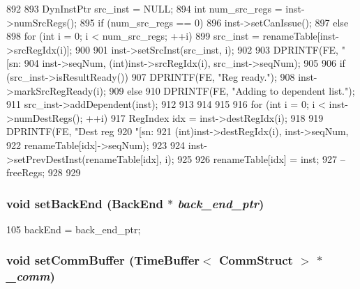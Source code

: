 \begin{DoxyCode}
892 {
893     DynInstPtr src_inst = NULL;
894     int num_src_regs = inst->numSrcRegs();
895     if (num_src_regs == 0) {
896         inst->setCanIssue();
897     } else {
898         for (int i = 0; i < num_src_regs; ++i) {
899             src_inst = renameTable[inst->srcRegIdx(i)];
900 
901             inst->setSrcInst(src_inst, i);
902 
903             DPRINTF(FE, "[sn:%
904                     inst->seqNum, (int)inst->srcRegIdx(i), src_inst->seqNum);
905 
906             if (src_inst->isResultReady()) {
907                 DPRINTF(FE, "Reg ready.\n");
908                 inst->markSrcRegReady(i);
909             } else {
910                 DPRINTF(FE, "Adding to dependent list.\n");
911                 src_inst->addDependent(inst);
912             }
913         }
914     }
915 
916     for (int i = 0; i < inst->numDestRegs(); ++i) {
917         RegIndex idx = inst->destRegIdx(i);
918 
919         DPRINTF(FE, "Dest reg %
920                 "[sn:%
921                 (int)inst->destRegIdx(i), inst->seqNum,
922                 renameTable[idx]->seqNum);
923 
924         inst->setPrevDestInst(renameTable[idx], i);
925 
926         renameTable[idx] = inst;
927         --freeRegs;
928     }
929 }
\end{DoxyCode}
\hypertarget{classFrontEnd_a5f15ff995704fecfa4b6e5d6147ec622}{
\subsubsection[{setBackEnd}]{\setlength{\rightskip}{0pt plus 5cm}void setBackEnd ({\bf BackEnd} $\ast$ {\em back\_\-end\_\-ptr})}}
\label{classFrontEnd_a5f15ff995704fecfa4b6e5d6147ec622}



\begin{DoxyCode}
105     { backEnd = back_end_ptr; }
\end{DoxyCode}
\hypertarget{classFrontEnd_aeabdb9f0aae07df67c3029f8fddb2693}{
\subsubsection[{setCommBuffer}]{\setlength{\rightskip}{0pt plus 5cm}void setCommBuffer ({\bf TimeBuffer}$<$ {\bf CommStruct} $>$ $\ast$ {\em \_\-comm})}}
\label{classFrontEnd_aeabdb9f0aae07df67c3029f8fddb2693}



